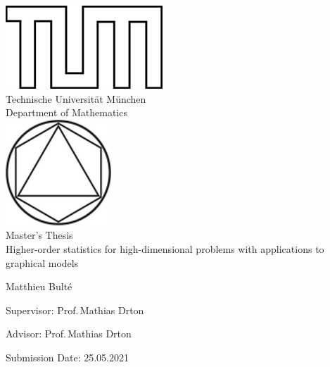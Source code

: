 
\pagestyle{empty}

\begin{titlepage}
    \begin{center}
    \includegraphics{TUMlschwarz.png}\\[3mm]
    \sf
    {\Large
      Technische Universit\"at M\"unchen\\[5mm]
      Department of Mathematics\\[8mm]
    }
    \normalsize
    \includegraphics{TUMlMschwarz.png}\\[15mm]
    
    Master's Thesis\\[15mm]
    
    {\Huge
    Higher-order statistics for high-dimensional problems with applications to graphical models
    }
    \bigskip
    
    \normalsize
    
    Matthieu Bult\'e
    \end{center}
    \vspace*{75mm}
    
    Supervisor: Prof.\,Mathias Drton
    \medskip
    
    Advisor: Prof.\,Mathias Drton
    \medskip
    
    Submission Date: 25.05.2021
    
\end{titlepage}



\newpage


\newpage


% 

\newpage
{}
\pagestyle{headings}